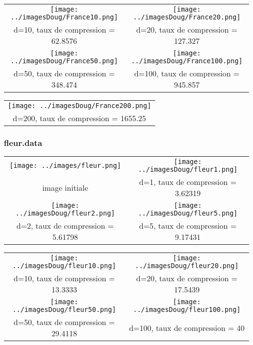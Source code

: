 \documentclass[11pt,a4paper]{article}
\begin{document}
\begin{center}
 \begin{tabular}{|c|c|}
\hline
 \texttt{[image: ../imagesDoug/France10.png]} & \texttt{[image: ../imagesDoug/France20.png]} \\
d=10, taux de compression = 62.8576  &  d=20, taux de compression = 127.327 \\
\hline
 \texttt{[image: ../imagesDoug/France50.png]} & \texttt{[image: ../imagesDoug/France100.png]} \\
d=50, taux de compression = 348.474   &  d=100, taux de compression = 945.857  \\
\hline
 \end{tabular}
 \end{center}

\begin{center}
 \begin{tabular}{|c|}
  \hline
 \texttt{[image: ../imagesDoug/France200.png]} \\
d=200, taux de compression = 1655.25\\
\hline
 \end{tabular}
\end{center}


\subsubsection{fleur.data}

\begin{center}
 \begin{tabular}{|c|c|}
\hline
 \texttt{[image: ../images/fleur.png]} & \texttt{[image: ../imagesDoug/fleur1.png]} \\
image initiale   &  d=1, taux de compression = 3.62319  \\
\hline
 \texttt{[image: ../imagesDoug/fleur2.png]} & \texttt{[image: ../imagesDoug/fleur5.png]} \\
d=2, taux de compression = 5.61798    &  d=5, taux de compression = 9.17431  \\
\hline
 \end{tabular}
 \end{center}

\begin{center}
 \begin{tabular}{|c|c|}
\hline
 \texttt{[image: ../imagesDoug/fleur10.png]} & \texttt{[image: ../imagesDoug/fleur20.png]} \\
d=10, taux de compression = 13.3333  &  d=20, taux de compression = 17.5439 \\
\hline
 \texttt{[image: ../imagesDoug/fleur50.png]} & \texttt{[image: ../imagesDoug/fleur100.png]} \\
d=50, taux de compression = 29.4118   &  d=100, taux de compression = 40  \\
\hline
 \end{tabular}
 \end{center}
\end{document}
